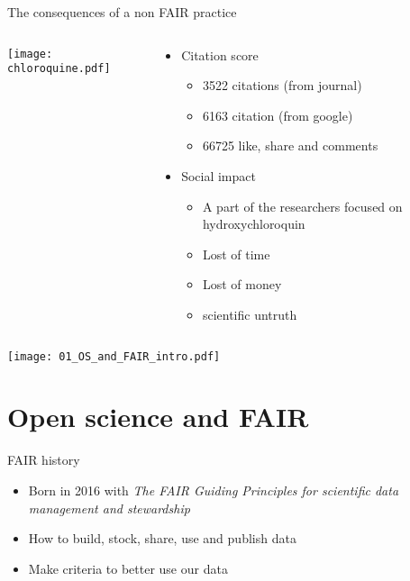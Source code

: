 \begin{frame}{The consequences of a non FAIR practice}
\begin{columns}
\begin{column}{0.5\textwidth}
    \begin{center}
     \texttt{[image: chloroquine.pdf]}
     \end{center}
\end{column}
\begin{column}{0.5\textwidth} 
\begin{itemize}
\item Citation score
     \begin{itemize}
		\item 3522 citations (from journal)
		\item 6163 citation (from google)
		\item 66725 like, share and comments
	\end{itemize}
\item Social impact
	\begin{itemize}
	\item A part of the researchers focused on hydroxychloroquin
	\item Lost of time
	\item Lost of money
	\item scientific untruth
	\end{itemize}		
\end{itemize}

\end{column}
\end{columns}

\end{frame}



\begin{frame}
\texttt{[image: 01\_OS\_and\_FAIR\_intro.pdf]}
\end{frame}


\section{Open science and FAIR}

\begin{frame}
\begin{block}{FAIR history}
\begin{itemize}
\item Born in 2016 with \textit{The FAIR Guiding Principles for scientific data management and stewardship}
\item How to build, stock, share, use and publish data
\item Make criteria to better use our data
\end{itemize}
\end{block}
\end{frame}

